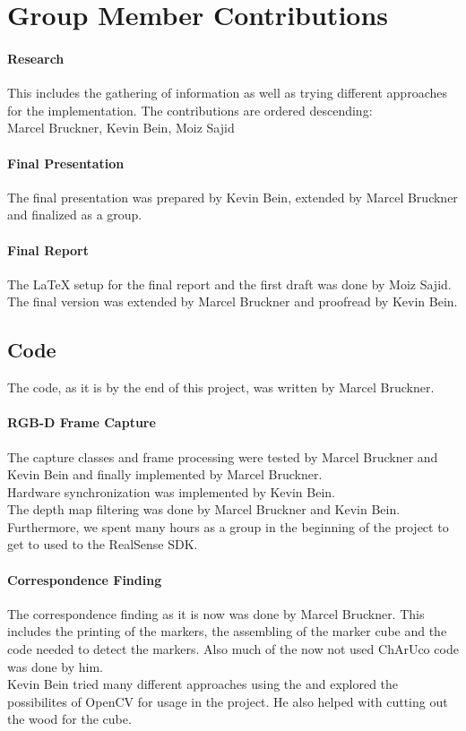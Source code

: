 \documentclass[10pt,twocolumn,letterpaper]{article}
\begin{document}
\clearpage
\section{Group Member Contributions}
\paragraph{Research}
This includes the gathering of information as well as trying different approaches for the implementation. The contributions are ordered descending:\\
Marcel Bruckner, Kevin Bein, Moiz Sajid

\paragraph{Final Presentation}
The final presentation was prepared by Kevin Bein, extended by Marcel Bruckner and finalized as a group.

\paragraph{Final Report}
The \LaTeX{} setup for the final report and the first draft was done by Moiz Sajid. The final version was extended by Marcel Bruckner and proofread by Kevin Bein.

\subsection{Code}
The code, as it is by the end of this project, was written by Marcel Bruckner.
\paragraph{RGB-D Frame Capture}
The capture classes and frame processing were tested by Marcel Bruckner and Kevin Bein and finally implemented by Marcel Bruckner.\\
Hardware synchronization was implemented by Kevin Bein.\\
The depth map filtering was done by Marcel Bruckner and Kevin Bein.\\
Furthermore, we spent many hours as a group in the beginning of the project to get to used to the RealSense SDK. 

\paragraph{Correspondence Finding}
The correspondence finding as it is now was done by Marcel Bruckner. This includes the printing of the markers, the assembling of the marker cube and the code needed to detect the markers. Also much of the now not used ChArUco code was done by him.\\
Kevin Bein tried many different approaches using the \charuco{} and explored the possibilites of OpenCV for usage in the project. He also helped with cutting out the wood for the cube.
\end{document}
